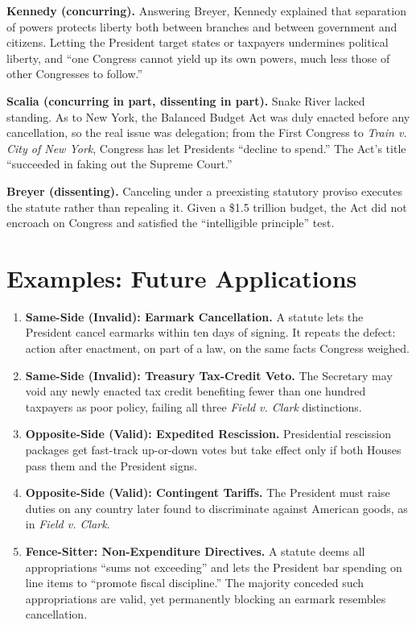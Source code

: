 \documentclass[12pt]{article}
\begin{document}
\textbf{Kennedy (concurring).} Answering Breyer, Kennedy explained that separation of powers protects liberty both between branches and between government and citizens. Letting the President target states or taxpayers undermines political liberty, and ``one Congress cannot yield up its own powers, much less those of other Congresses to follow.''

\textbf{Scalia (concurring in part, dissenting in part).} Snake River lacked standing. As to New York, the Balanced Budget Act was duly enacted before any cancellation, so the real issue was delegation; from the First Congress to \textit{Train v. City of New York}, Congress has let Presidents ``decline to spend.'' The Act's title ``succeeded in faking out the Supreme Court.''

\textbf{Breyer (dissenting).} Canceling under a preexisting statutory proviso executes the statute rather than repealing it. Given a \$1.5 trillion budget, the Act did not encroach on Congress and satisfied the ``intelligible principle'' test.

\section{Examples: Future Applications}

\begin{enumerate}
\item \textbf{Same-Side (Invalid): Earmark Cancellation.} A statute lets the President cancel earmarks within ten days of signing. It repeats the defect: action after enactment, on part of a law, on the same facts Congress weighed.
\item \textbf{Same-Side (Invalid): Treasury Tax-Credit Veto.} The Secretary may void any newly enacted tax credit benefiting fewer than one hundred taxpayers as poor policy, failing all three \textit{Field v. Clark} distinctions.
\item \textbf{Opposite-Side (Valid): Expedited Rescission.} Presidential rescission packages get fast-track up-or-down votes but take effect only if both Houses pass them and the President signs.
\item \textbf{Opposite-Side (Valid): Contingent Tariffs.} The President must raise duties on any country later found to discriminate against American goods, as in \textit{Field v. Clark}.
\item \textbf{Fence-Sitter: Non-Expenditure Directives.} A statute deems all appropriations ``sums not exceeding'' and lets the President bar spending on line items to ``promote fiscal discipline.'' The majority conceded such appropriations are valid, yet permanently blocking an earmark resembles cancellation.
\end{enumerate}
\end{document}
